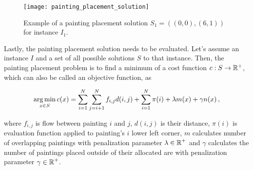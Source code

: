 \begin{figure}
    \texttt{[image: painting\_placement\_solution]}
    \caption[Example of a painting placement solution.]{Example of a painting placement solution $S_1 = ((0,0), (6,1))$ for instance $I_1$.}
    \label{fig:painting-placement-solution}
\end{figure}

\newpage

Lastly, the painting placement solution needs to be evaluated.
Let's assume an instance $I$ and a set of all possible solutions $S$ to that instance.
Then, the painting placement problem is to find a minimum of a cost function $c: S \to \operatorname*{\mathbb{R}^+}$,
which can also be called an objective function, as


\begin{equation}
    \operatorname*{arg\,min}_{x \in S} c(x) = \sum\limits_{i=1}^N\sum\limits_{j=i+1}^N f_{i,j}d(i, j) + \sum\limits_{i=1}^N \pi(i) + \lambda m(x) + \gamma n(x) \,,
    \label{eq:objective}
\end{equation}

where $f_{i,j}$ is flow between painting $i$ and $j$, $d(i,j)$ is their distance,
$\pi(i)$ is evaluation function applied to painting's $i$ lower left corner,
$m$ calculates number of overlapping paintings with penalization parameter $\lambda \in \operatorname*{\mathbb{R}}^+$
and $\gamma$ calculates the number of paintings placed outside of their allocated are
with penalization parameter $\gamma \in \operatorname*{\mathbb{R}}^+$.